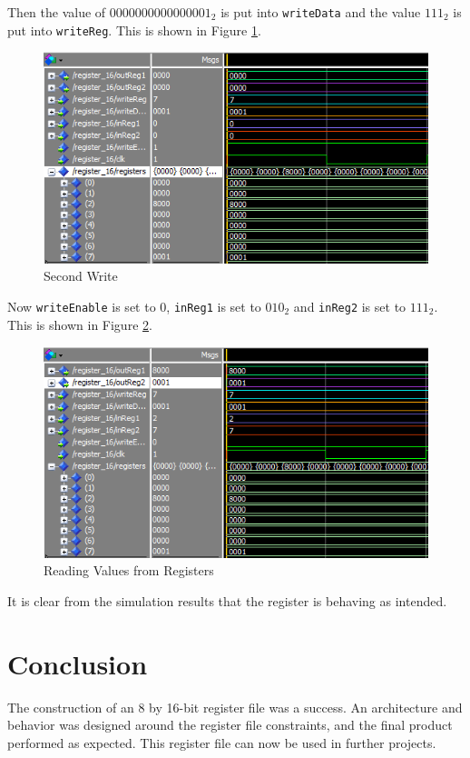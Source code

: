 \documentclass[12pt]{article}
\begin{document}
Then the value of  $0000000000000001_2$ is put into \texttt{writeData} and the value $111_2$ is put into \texttt{writeReg}. This is shown in Figure \ref{fig:write2}.

\begin{figure}[H]
\centering
\includegraphics[width=1\linewidth]{write2}
\caption{Second Write}
\label{fig:write2}
\end{figure}

Now \texttt{writeEnable} is set to 0, \texttt{inReg1} is set to $010_2$ and \texttt{inReg2} is set to $111_2$. This is shown in Figure \ref{fig:sim-read}. 

\begin{figure}[H]
\centering
\includegraphics[width=1\linewidth]{sim-read}
\caption{Reading Values from Registers}
\label{fig:sim-read}
\end{figure}

It is clear from the simulation results that the register is behaving as intended.
\section{Conclusion}
The construction of an 8 by 16-bit register file was a success. An architecture and behavior was designed around the register file constraints, and the final product performed as expected. This register file can now be used in further projects.
\end{document}

